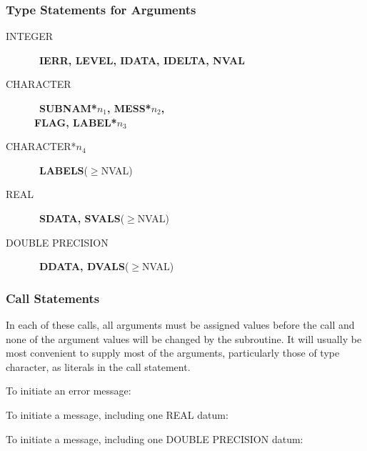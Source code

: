 \documentclass[twoside]{MATH77}
\begin{document}
\subsubsection{Type Statements for Arguments}
\begin{description}
\item[INTEGER] \ {\bf IERR, LEVEL, IDATA, IDELTA, NVAL}

\item[CHARACTER] \ {\bf SUBNAM*$n_1$, MESS*$n_2$,\\
FLAG, LABEL*$n_3$}

\item[CHARACTER*$n_4$] \ {\bf LABELS}($\geq $NVAL)

\item[REAL] \ {\bf SDATA, SVALS}($\geq $NVAL)

\item[DOUBLE PRECISION] \ {\bf DDATA, DVALS}($\geq $NVAL)
\end{description}

\subsubsection{Call Statements}

In each of these calls, all arguments must be assigned values before the
call and none of the argument values will be changed by the subroutine. It
will usually be most convenient to supply most of the arguments,
particularly those of type character, as literals in the call statement.

To initiate an error message:

\begin{center}
\end{center}

To initiate a message, including one REAL datum:

\begin{center}
\end{center}

To initiate a message, including one DOUBLE PRECISION datum:
\end{document}
